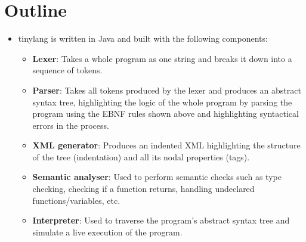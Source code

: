 \section{Outline}
\begin{itemize}
	\item tinylang is written in Java and built with the following components:
	      \begin{itemize}
	      	\item \textbf{Lexer}: Takes a whole program as one string and breaks it down into a sequence of tokens.
	      	\item \textbf{Parser}: Takes all tokens produced by the lexer and produces an abstract syntax tree, highlighting the logic of the whole program by parsing the program using the EBNF rules shown above and highlighting syntactical errors in the process.
	      	\item \textbf{XML generator}: Produces an indented XML highlighting the structure of the tree (indentation) and all its nodal properties (tags).
	      	\item \textbf{Semantic analyser}: Used to perform semantic checks such as type checking, checking if a function returns, handling undeclared functions/variables, etc.
	      	\item \textbf{Interpreter}: Used to traverse the program's abstract syntax tree and simulate a live execution of the program.
	      \end{itemize}
\end{itemize}